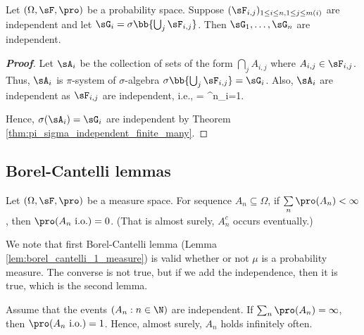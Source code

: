 \begin{theorem}\label{thm:pi_sigma_independent_finite_many_ij}
Let $(\Omega,\sF,\pro)$ be a probability space. Suppose $(\sF_{i,j})_{1\leq i \leq n, 1 \leq j \leq m(i)}$ are independent %
and let $\sG_i = \sigma\bb{\bigcup_j \sF_{i,j}}$. Then $\sG_1, \dots, \sG_n$ are independent.
\end{theorem}

\begin{proof}[\bf Proof]
Let $\sA_i$ be the collection of sets of the form $\bigcap_jA_{i,j}$ where $A_{i,j} \in \sF_{i,j}$. Thus, $\sA_i$ is $\pi$-system of $\sigma$-algebra $\sigma\bb{\bigcup_j \sF_{i,j}} = \sG_i$. Also, $\sA_i$ are independent as $\sF_{i,j}$ are independent, i.e.,
\be
\pro{} = \prod^n_{i=1}\pro{}.
\ee

Hence, $\sigma(\sA_i) =\sG_i$ are independent by Theorem \ref{thm:pi_sigma_independent_finite_many}.
\end{proof}


\subsection{Borel-Cantelli lemmas}


\begin{lemma}\label{lem:borel_cantelli_1_probability}
Let $(\Omega,\sF,\pro)$ be a measure space. For sequence $A_n \subseteq \Omega$, if $\sum\limits_n \pro(A_n) < \infty$, then $\pro(A_n\text{ i.o.}) = 0$. (That is almost surely, $A_n^c$ occurs eventually.)
\end{lemma}

We note that first Borel-Cantelli lemma (Lemma \ref{lem:borel_cantelli_1_measure}) is valid whether or not $\mu$ is a probability measure. The converse is not true, but if we add the independence, then it is true, which is the second lemma.

\begin{lemma}\label{lem:borel_cantelli_2}
Assume that the events $(A_n:n\in\N)$ are independent. If $\sum_n \pro(A_n)=\infty$, then $\pro(A_n \text{ i.o.})=1$. Hence, almost surely, $A_n$ holds infinitely often.
\end{lemma}

